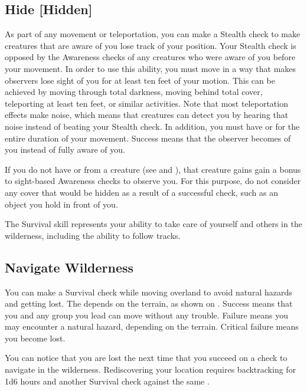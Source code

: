     \subsection{Hide [Hidden]}
        As part of any movement or teleportation, you can make a Stealth check to make creatures that are aware of you lose track of your position.
        Your Stealth check is opposed by the Awareness checks of any creatures who were aware of you before your movement.
        In order to use this ability, you must move in a way that makes observers lose sight of you for at least ten feet of your motion.
        This can be achieved by moving through total darkness, moving behind total cover, teleporting at least ten feet, or similar activities.
        Note that most teleportation effects make noise, which means that creatures can detect you by hearing that noise instead of beating your Stealth check.
        In addition, you must have  or  for the entire duration of your movement.
        Success means that the observer becomes \partiallyunaware of you instead of fully aware of you.

        If you do not have  or  from a creature (see  and ), that creature gains gain a  bonus to sight-based Awareness checks to observe you.
        For this purpose, do not consider any cover that would be hidden as a result of a successful check, such as an object you hold in front of you.

\newpage
{}
        The Survival skill represents your ability to take care of yourself and others in the wilderness, including the ability to follow tracks.

    \subsection{Navigate Wilderness}
        You can make a Survival check while moving overland to avoid natural hazards and getting lost. The  depends on the terrain, as shown on . Success means that you and any group you lead can move without any trouble. Failure means you may encounter a natural hazard, depending on the terrain. Critical failure means you become lost.

        You can notice that you are lost the next time that you succeed on a check to navigate in the wilderness. Rediscovering your location requires backtracking for 1d6 hours and another Survival check against the same \@.

